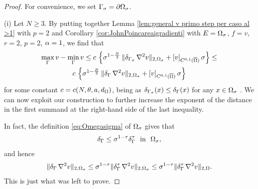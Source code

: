 \documentclass[a4paper,10pt]{amsart}
\numberwithin{equation}{section}
\begin{document}
\begin{proof}
For convenience, we set $\Gamma_\sigma=\partial\Omega_\sigma$.
\par
(i) Let $N \ge 3$. By putting together Lemma \ref{lem:general v primo step per caso al >1} with $p=2$ and Corollary \ref{cor:JohnPoincareaigradienti} with $E=\Omega_\sigma$, $f=v$, $r=2$, $p=2$, $\alpha=1$, we find that
\begin{multline*}
\max_{\Gamma} v - \min_{\Gamma} v \le 
c \, \left\{ \sigma^{1-\frac{N}{2}} \, \Vert \delta_{\Gamma_\sigma} \, \nabla^2 v  \Vert_{2, \Omega_\sigma } + \left[ v \right]_{C^{0,1}(\overline{\Omega})} \sigma \right\} \le 
\\
c \, \left\{ \sigma^{1-\frac{N}{2}} \, \Vert \delta_{\Gamma} \, \nabla^2 v  \Vert_{2, \Omega_\sigma } + \left[ v \right]_{C^{0,1}(\overline{\Omega})} \sigma \right\}
\end{multline*}
for some constant $c=c(N, \theta, a, d_\Omega)$,
being as $\delta_{\Gamma_\sigma} (x) \le \delta_{\Gamma} (x)$ for any $x\in \Omega_\sigma$ .
We can now exploit our construction to further increase the exponent of the distance in the first summand at the right-hand side of the last inequality. 
\par
In fact, the definition \eqref{eq:Omegasigma} of $\Omega_\sigma$ gives that
$$
\de_\Ga \le \si^{ 1 - \tau } \de_\Ga^\tau \ \mbox{ in } \ \Om_\si,
$$
and hence 
$$
\Vert \delta_{\Gamma} \, \nabla^2 v  \Vert_{2, \Omega_\sigma }  \le 
\sigma^{ 1 - \tau}  \Vert \delta_{\Gamma}^\tau \, \nabla^2 v  \Vert_{2, \Omega_\sigma } \le 
\sigma^{1- \tau}  \Vert \delta_{\Gamma}^\tau \, \nabla^2 v  \Vert_{2, \Omega }.
$$
This is just what was left to prove.


\end{proof}
\end{document}
